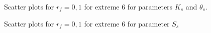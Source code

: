 \documentclass[review,times,3p,twocolumn,10pt]{elsarticle}
\begin{document}
\begin{figure}[htb!]
\label{ext6rf0-Kt}
\caption{Scatter plots for $r_f=0,1$ for extreme 6 for parameters $K_s$ and $\theta_s$. }
\end{figure}

\begin{figure}[htb!]
\label{ext6rf0-Ss}
\caption{Scatter plots for $r_f=0,1$ for extreme 6 for parameter $S_s$}
\end{figure}
\end{document}

